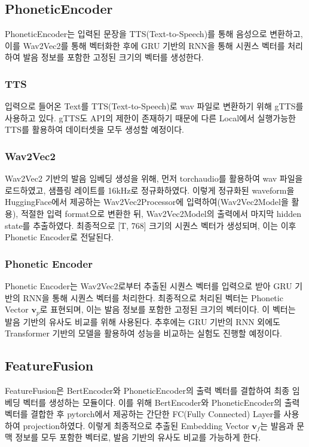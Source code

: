 \documentclass[letterpaper]{article} %
\begin{document}
\subsection{PhoneticEncoder}
PhoneticEncoder는 입력된 문장을 TTS(Text-to-Speech)를 통해 음성으로 변환하고, 이를 Wav2Vec2를 통해 벡터화한 후에 GRU 기반의 RNN을 통해 시퀀스 벡터를 처리하여 발음 정보를 포함한 고정된 크기의 벡터를 생성한다.
\subsubsection{TTS}
입력으로 들어온 Text를 TTS(Text-to-Speech)로 wav 파일로 변환하기 위해 gTTS를 사용하고 있다. gTTS도 API의 제한이 존재하기 때문에 다른 Local에서 실행가능한 TTS를 활용하여 데이터셋을 모두 생성할 예정이다.

\subsubsection{Wav2Vec2}
Wav2Vec2 기반의 발음 임베딩 생성을 위해, 먼저 torchaudio를 활용하여 wav 파일을 로드하였고, 샘플링 레이트를  16kHz로 정규화하였다. 
이렇게 정규화된 waveform을 HuggingFace에서 제공하는 Wav2Vec2Processor에 입력하여(Wav2Vec2Model을 활용), 적절한 입력 format으로 변환한 뒤, Wav2Vec2Model의 출력에서 마지막 hidden state를 추출하였다. 
최종적으로 [T, 768] 크기의 시퀀스 벡터가 생성되며, 이는 이후 Phonetic Encoder로 전달된다.

\subsubsection{Phonetic Encoder}
Phonetic Encoder는 Wav2Vec2로부터 추출된 시퀀스 벡터를 입력으로 받아 GRU 기반의 RNN을 통해 시퀀스 벡터를 처리한다.
최종적으로 처리된 벡터는 Phonetic Vector $\mathbf{v}_p$로 표현되며, 이는 발음 정보를 포함한 고정된 크기의 벡터이다. 이 벡터는 발음 기반의 유사도 비교를 위해 사용된다.
추후에는 GRU 기반의 RNN 외에도 Transformer 기반의 모델을 활용하여 성능을 비교하는 실험도 진행할 예정이다.

\subsection{FeatureFusion}
FeatureFusion은 BertEncoder와 PhoneticEncoder의 출력 벡터를 결합하여 최종 임베딩 벡터를 생성하는 모듈이다.
이를 위해 BertEncoder와 PhoneticEncoder의 출력 벡터를 결합한 후 pytorch에서 제공하는 간단한 FC(Fully Connected) Layer를 사용하여 projection하였다. 이렇게 최종적으로 추출된 Embedding Vector $\mathbf{v}_f$는 발음과 문맥 정보를 모두 포함한 벡터로, 발음 기반의 유사도 비교를 가능하게 한다.
\end{document}
